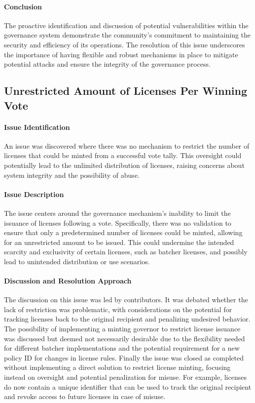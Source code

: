 \documentclass[11pt]{article}
\begin{document}
\paragraph{Conclusion}
The proactive identification and discussion of potential vulnerabilities within the governance system demonstrate the community's commitment to maintaining the security and efficiency of its operations. The resolution of this issue underscores the importance of having flexible and robust mechanisms in place to mitigate potential attacks and ensure the integrity of the governance process.

\subsection{Unrestricted Amount of Licenses Per Winning Vote}

\paragraph{Issue Identification}
An issue was discovered where there was no mechanism to restrict the number of licenses that could be minted from a successful vote tally.
This oversight could potentially lead to the unlimited distribution of licenses, raising concerns about system integrity and the possibility of abuse.

\paragraph{Issue Description}
The issue centers around the governance mechanism's inability to limit the issuance of licenses following a vote.
Specifically, there was no validation to ensure that only a predetermined number of licenses could be minted, allowing for an unrestricted amount to be issued.
This could undermine the intended scarcity and exclusivity of certain licenses, such as batcher licenses, and possibly lead to unintended distribution or use scenarios.

\paragraph{Discussion and Resolution Approach}
The discussion on this issue was led by contributors.
It was debated whether the lack of restriction was problematic, with considerations on the potential for tracking licenses back to the original recipient and penalizing undesired behavior.
The possibility of implementing a minting governor to restrict license issuance was discussed but deemed not necessarily desirable due to the flexibility needed for different batcher implementations and the potential requirement for a new policy ID for changes in license rules.
Finally the issue was closed as completed without implementing a direct solution to restrict license minting, focusing instead on oversight and potential penalization for misuse.
For example, licenses do now contain a unique identifier that can be used to track the original recipient and revoke access to future licenses in case of misuse.
\end{document}
